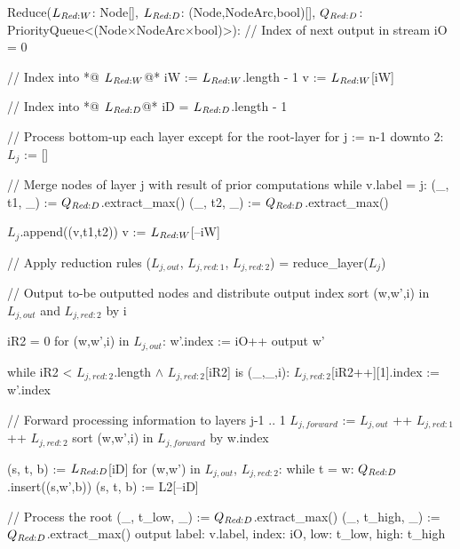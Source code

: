\begin{blstlisting}
    Reduce($\ReduceLwork$: Node[],
           $\ReduceLdep$: (Node,NodeArc,bool)[],
           $\ReduceQdep$: PriorityQueue<(Node$\times$NodeArc$\times$bool)>):
      // Index of next output in stream
      iO = 0

      // Index into *@\color{cGray} $\ReduceLwork$@*
      iW := $\ReduceLwork$.length - 1
      v := $\ReduceLwork$[iW]

      // Index into *@\color{cGray} $\ReduceLdep$@*
      iD = $\ReduceLdep$.length - 1

      // Process bottom-up each layer except for the root-layer
      for j := n-1 downto 2:
          $L_{j}$ := []

          // Merge nodes of layer j with result of prior computations
          while v.label = j:
              (_, t1, _) := $\ReduceQdep$.extract_max()
              (_, t2, _) := $\ReduceQdep$.extract_max()

              $L_{j}$.append((v,t1,t2))
              v := $\ReduceLwork$[--iW]

          // Apply reduction rules
          ($L_{j,\mathit{out}}$, $L_{j,\mathit{red:}1}$, $L_{j,\mathit{red:}2}$) = reduce_layer($L_{j}$)

          // Output to-be outputted nodes and distribute output index
          sort (w,w',i) in $L_{j,\mathit{out}}$ and $L_{j,\mathit{red:}2}$ by i

          iR2 = 0
          for (w,w',i) in $L_{j,\mathit{out}}$:
              w'.index := iO++
              output w'

              while iR2 < $L_{j,\mathit{red:}2}$.length $\land$ $L_{j,\mathit{red:}2}$[iR2] is (_,_,i):
                  $L_{j,\mathit{red:}2}$[iR2++][1].index := w'.index

          // Forward processing information to layers j-1 .. 1
          $L_{j,\mathit{forward}}$ := $L_{j,\mathit{out}}$ ++ $L_{j,\mathit{red:}1}$ ++ $L_{j,\mathit{red:}2}$
          sort (w,w',i) in $L_{j,\mathit{forward}}$ by w.index

          (s, t, b) := $\ReduceLdep$[iD]
          for (w,w') in $L_{j,\mathit{out}}$, $L_{j,\mathit{red:}2}$:
              while t = w:
                  $\ReduceQdep$.insert((s,w',b))
                  (s, t, b) := L2[--iD]

      // Process the root
      (_, t_low,  _) := $\ReduceQdep$.extract_max()
      (_, t_high, _) := $\ReduceQdep$.extract_max()
      output { label: v.label, index: iO, low: t_low, high: t_high }
\end{blstlisting}
